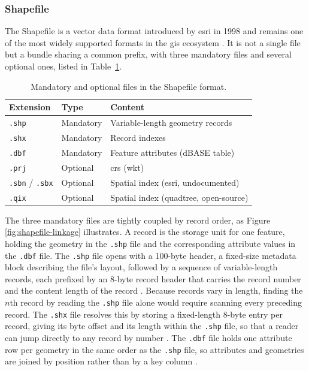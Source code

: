 \subsubsection{Shapefile}
\label{background:spatial-data-formats-and-storage-models:file-formats:shapefile}
The Shapefile is a vector data format introduced by \acrfull{esri} in 1998 and remains one of the most widely supported formats in the \acrfull{gis} ecosystem \parencite{esri1998_shapefile_technical_description}. It is not a single file but a bundle sharing a common prefix, with three mandatory files and several optional ones, listed in Table~\ref{tab:shapefile-components}.

\begin{table}[H]
    \centering
    \caption[Shapefile component files]{Mandatory and optional files in the Shapefile format.}
    \label{tab:shapefile-components}
    \begin{tabular}{lll}
        \toprule
        \textbf{Extension} & \textbf{Type} & \textbf{Content} \\
        \midrule
        \texttt{.shp} & Mandatory & Variable-length geometry records \\
        \texttt{.shx} & Mandatory & Record indexes \\
        \texttt{.dbf} & Mandatory & Feature attributes (dBASE table) \\
        \texttt{.prj} & Optional & \acrlong{crs} (\acrshort{wkt}) \\
        \texttt{.sbn} / \texttt{.sbx} & Optional & Spatial index (\acrshort{esri}, undocumented) \\
        \texttt{.qix} & Optional & Spatial index (quadtree, open-source) \\
        \bottomrule
    \end{tabular}
\end{table}

The three mandatory files are tightly coupled by record order, as Figure \ref{fig:shapefile-linkage} illustrates. A record is the storage unit for one feature, holding the geometry in the \texttt{.shp} file and the corresponding attribute values in the \texttt{.dbf} file. The \texttt{.shp} file opens with a \num{100}-byte header, a fixed-size metadata block describing the file's layout, followed by a sequence of variable-length records, each prefixed by an \num{8}-byte record header that carries the record number and the content length of the record \parencite{esri1998_shapefile_technical_description}. Because records vary in length, finding the \(n\)th record by reading the \texttt{.shp} file alone would require scanning every preceding record. The \texttt{.shx} file resolves this by storing a fixed-length \num{8}-byte entry per record, giving its byte offset and its length within the \texttt{.shp} file, so that a reader can jump directly to any record by number \parencite{esri1998_shapefile_technical_description}. The \texttt{.dbf} file holds one attribute row per geometry in the same order as the \texttt{.shp} file, so attributes and geometries are joined by position rather than by a key column \parencite{esri1998_shapefile_technical_description}.

